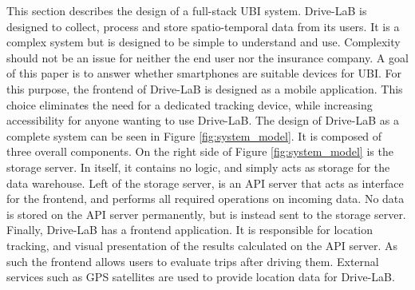 This section describes the design of a full-stack UBI system. Drive-LaB is designed to collect, process and store spatio-temporal data from its users. It is a complex system but is designed to be simple to understand and use. Complexity should not be an issue for neither the end user nor the insurance company.
A goal of this paper is to answer whether smartphones are suitable devices for UBI. For this purpose, the frontend of Drive-LaB is designed as a mobile application. This choice eliminates the need for a dedicated tracking device, while increasing accessibility for anyone wanting to use Drive-LaB.
The design of Drive-LaB as a complete system can be seen in Figure \ref{fig:system_model}. It is composed of three overall components. On the right side of Figure \ref{fig:system_model} is the storage server. In itself, it contains no logic, and simply acts as storage for the data warehouse. Left of the storage server, is an API server that acts as interface for the frontend, and performs all required operations on incoming data. No data is stored on the API server permanently, but is instead sent to the storage server. Finally, Drive-LaB has a frontend application. It is responsible for location tracking, and visual presentation of the results calculated on the API server. As such the frontend allows users to evaluate trips after driving them. External services such as GPS satellites are used to provide location data for Drive-LaB.